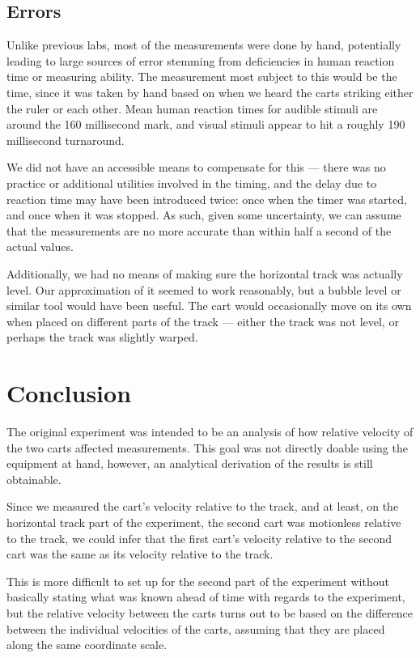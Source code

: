\documentclass{article}
\begin{document}
\subsection{Errors}

Unlike previous labs, most of the measurements were done by hand, potentially leading to large sources of error stemming from deficiencies in human reaction time or measuring ability.
The measurement most subject to this would be the time, since it was taken by hand based on when we heard the carts striking either the ruler or each other.
Mean human reaction times for audible stimuli are around the 160 millisecond mark, and visual stimuli appear to hit a roughly 190 millisecond turnaround\cite{kosinski2010}.

We did not have an accessible means to compensate for this --- there was no practice or additional utilities involved in the timing, and the delay due to reaction time may have been introduced twice:
once when the timer was started, and once when it was stopped.
As such, given some uncertainty, we can assume that the measurements are no more accurate than within half a second of the actual values.

Additionally, we had no means of making sure the horizontal track was actually level.
Our approximation of it seemed to work reasonably, but a bubble level or similar tool would have been useful.
The cart would occasionally move on its own when placed on different parts of the track --- either the track was not level, or perhaps the track was slightly warped.

\section{Conclusion}

The original experiment was intended to be an analysis of how relative velocity of the two carts affected measurements.
This goal was not directly doable using the equipment at hand, however, an analytical derivation of the results is still obtainable.

Since we measured the cart's velocity relative to the track, and at least, on the horizontal track part of the experiment, the second cart was motionless relative to the track,
we could infer that the first cart's velocity relative to the second cart was the same as its velocity relative to the track.

This is more difficult to set up for the second part of the experiment without basically stating what was known ahead of time with regards to the experiment,
but the relative velocity between the carts turns out to be based on the difference between the individual velocities of the carts,
assuming that they are placed along the same coordinate scale.




\end{document}
